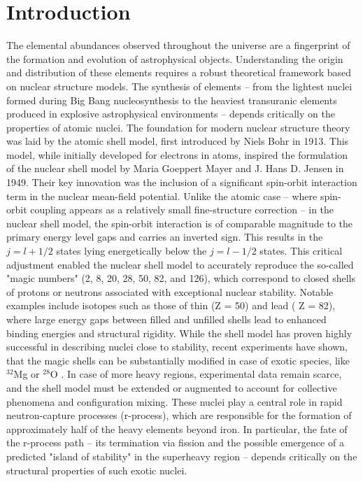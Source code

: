 \section{Introduction}
The elemental abundances observed throughout the universe are a fingerprint of the formation and evolution of astrophysical objects. Understanding the origin and distribution of these elements requires a robust theoretical framework based on nuclear structure models. The synthesis of elements -- from the lightest nuclei formed during Big Bang nucleosynthesis to the heaviest transuranic elements produced in explosive astrophysical environments -- depends critically on the properties of atomic nuclei.\newline
The foundation for modern nuclear structure theory was laid by the atomic shell model, first introduced by Niels Bohr in 1913. This model, while initially developed for electrons in atoms, inspired the formulation of the nuclear shell model by Maria Goeppert Mayer and J. Hans D. Jensen in 1949. Their key innovation was the inclusion of a significant spin-orbit interaction term in the nuclear mean-field potential. Unlike the atomic case -- where spin-orbit coupling appears as a relatively small fine-structure correction -- in the nuclear shell model, the spin-orbit interaction is of comparable magnitude to the primary energy level gaps and carries an inverted sign. This results in the $j = l + 1/2$ states lying energetically below the $j = l - 1/2$  states.\newline
This critical adjustment enabled the nuclear shell model to accurately reproduce the so-called "magic numbers" (2, 8, 20, 28, 50, 82, and 126), which correspond to closed shells of protons or neutrons associated with exceptional nuclear stability. Notable examples include isotopes such as those of thin (Z = 50) and  lead ( Z = 82), where large energy gaps between filled and unfilled shells lead to enhanced binding energies and structural rigidity.\newline
While the shell model has proven highly successful in describing nuclei close to stability, recent experiments have shown, that the magic shells can be substantially modified in case of exotic species, like $^{32}$Mg \cite{wimmer2010discovery} or $^{28}$O \cite{kanungo2009one}. In case of more heavy regions, experimental data remain scarce, and the shell model must be extended or augmented to account for collective phenomena and configuration mixing. These nuclei play a central role in rapid neutron-capture processes (r-process), which are responsible for the formation of approximately half of the heavy elements beyond iron. In particular, the fate of the r-process path -- its termination via fission and the possible emergence of a predicted "island of stability" in the superheavy region -- depends critically on the structural properties of such exotic nuclei.\newline
